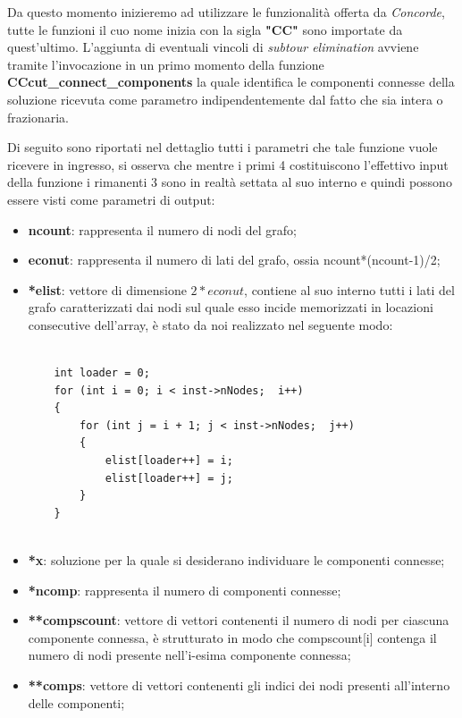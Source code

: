\documentclass[11pt]{article}
\begin{document}
Da questo momento inizieremo ad utilizzare le funzionalità offerta da \textit{Concorde}, tutte le funzioni il cuo nome inizia con la sigla \textbf{"CC"} sono importate da quest'ultimo.
L'aggiunta di eventuali vincoli di \textit{subtour elimination} avviene tramite l'invocazione in un primo momento della funzione \textbf{CCcut\_connect\_components} la quale identifica le componenti connesse della soluzione ricevuta come parametro indipendentemente dal fatto che sia intera o frazionaria.

Di seguito sono riportati nel dettaglio tutti i parametri che tale funzione vuole ricevere in ingresso, si osserva che mentre i primi 4 costituiscono l'effettivo input della funzione i rimanenti 3 sono in realtà settata al suo interno e quindi possono essere visti come parametri di output:

\begin{itemize}
    \item \textbf{ncount}: rappresenta il numero di nodi del grafo;
    \item \textbf{econut}: rappresenta il numero di lati del grafo, ossia ncount*(ncount-1)/2;
    \item \textbf{*elist}: vettore di dimensione $2*econut$, contiene al suo interno tutti i lati del grafo caratterizzati dai nodi sul quale esso incide memorizzati in locazioni consecutive dell’array, è stato da noi realizzato nel seguente modo:
    
    \begin{lstlisting}
    
    int loader = 0;
    for (int i = 0; i < inst->nNodes;  i++)
    {
        for (int j = i + 1; j < inst->nNodes;  j++) 
        {
            elist[loader++] = i;
            elist[loader++] = j;
        }
    }
    
    \end{lstlisting}
    
    \item \textbf{*x}: soluzione per la quale si desiderano individuare le componenti connesse;
    \item \textbf{*ncomp}: rappresenta il numero di componenti connesse;
    \item \textbf{**compscount}: vettore di vettori contenenti il numero di nodi per ciascuna componente connessa, è strutturato in modo che compscount[i] contenga il numero di nodi presente nell’i-esima componente connessa;
    \item \textbf{**comps}: vettore di vettori contenenti gli indici dei nodi presenti all'interno delle componenti;
\end{itemize}
\end{document}

